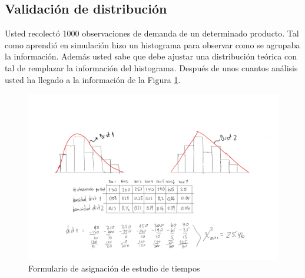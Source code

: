 \documentclass[11pt]{exam}
\begin{document}
\begin{questions}

\newpage
\section*{Validaci\'on de distribuci\'on}

\question Usted recolect\'o 1000 observaciones de demanda de un determinado producto. Tal como aprendi\'o en simulaci\'on hizo un histograma para observar como se agrupaba la informaci\'on. Adem\'as usted sabe que debe ajustar una distribuci\'on te\'orica con tal de remplazar la informaci\'on del histograma. Despu\'es de unos cuantos an\'alisis usted ha llegado a la informaci\'on de la Figura \ref{fig:chi2}.
 
\begin{figure}[htbp]
\centering
		\includegraphics[scale=0.43,keepaspectratio,trim={2cm 7cm 6cm 2cm},clip,angle =0]{chi2.png}
			\caption{Formulario de asignaci\'on de estudio de tiempos}
			\label{fig:chi2}
\end{figure}


\end{questions}
\end{document}
